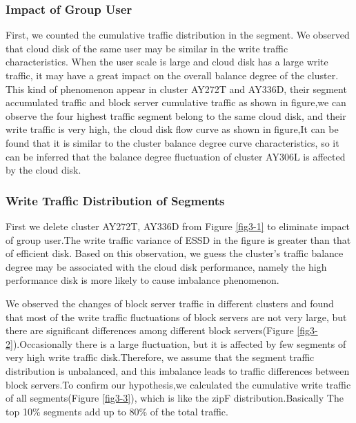 \subsubsection{Impact of Group User}
\label{sec3.1-2}
First, we counted the cumulative traffic distribution in the segment. We observed that cloud disk of the same user may be similar in the write traffic characteristics. When the user scale is large and cloud disk has a large write traffic, it may have a great impact on the overall balance degree of the cluster. This kind of phenomenon appear in cluster AY272T and AY336D, their segment accumulated traffic and block server cumulative traffic as shown in figure,we can observe the four highest traffic segment belong to the same cloud disk, and their write traffic is very high, the cloud disk flow curve as shown in figure,It can be found that it is similar to the cluster balance degree curve characteristics, so it can be inferred that the balance degree fluctuation of cluster AY306L is affected by the cloud disk.


\subsubsection{Write Traffic Distribution of Segments}
\label{sec3.1-3}
First we delete cluster AY272T, AY336D from Figure \ref{fig3-1} to eliminate impact of group user.The write traffic variance of ESSD in the figure is greater than that of efficient disk. Based on this observation, we guess the cluster's traffic balance degree may be associated with the cloud disk performance, namely the high performance disk is more likely to cause imbalance phenomenon.

We observed the changes of block server traffic in different clusters and found that most of the write traffic fluctuations of block servers are not very large, but there are significant differences among different block servers(Figure \ref{fig3-2}).Occasionally there is a large fluctuation, but it is affected by  few segments of very high write traffic disk.Therefore, we assume that the segment traffic distribution is unbalanced, and this imbalance leads to traffic differences between block servers.To confirm our hypothesis,we calculated the cumulative write traffic of all segments(Figure \ref{fig3-3}), which is like the zipF distribution.Basically The top 10\% segments add up to 80\% of the total traffic.


